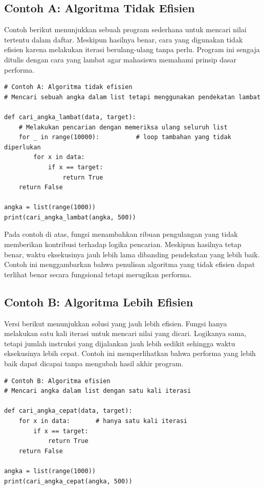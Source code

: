 \subsection{Contoh A: Algoritma Tidak Efisien}

Contoh berikut menunjukkan sebuah program sederhana untuk mencari nilai tertentu dalam daftar. Meskipun hasilnya benar, cara yang digunakan tidak efisien karena melakukan iterasi berulang-ulang tanpa perlu. Program ini sengaja ditulis dengan cara yang lambat agar mahasiswa memahami prinsip dasar performa.

\begin{lstlisting}[style=PythonStyle, caption={Contoh A: Algoritma tidak efisien}, label={lst:b14-a-algoritma-tidak-efisien}]
# Contoh A: Algoritma tidak efisien
# Mencari sebuah angka dalam list tetapi menggunakan pendekatan lambat

def cari_angka_lambat(data, target):
    # Melakukan pencarian dengan memeriksa ulang seluruh list
    for _ in range(10000):          # loop tambahan yang tidak diperlukan
        for x in data:
            if x == target:
                return True
    return False

angka = list(range(1000))
print(cari_angka_lambat(angka, 500))
\end{lstlisting}

Pada contoh di atas, fungsi menambahkan ribuan pengulangan yang tidak memberikan kontribusi terhadap logika pencarian. Meskipun hasilnya tetap benar, waktu eksekusinya jauh lebih lama dibanding pendekatan yang lebih baik. Contoh ini menggambarkan bahwa penulisan algoritma yang tidak efisien dapat terlihat benar secara fungsional tetapi merugikan performa.

\subsection{Contoh B: Algoritma Lebih Efisien}

Versi berikut menunjukkan solusi yang jauh lebih efisien. Fungsi hanya melakukan satu kali iterasi untuk mencari nilai yang dicari. Logikanya sama, tetapi jumlah instruksi yang dijalankan jauh lebih sedikit sehingga waktu eksekusinya lebih cepat. Contoh ini memperlihatkan bahwa performa yang lebih baik dapat dicapai tanpa mengubah hasil akhir program.

\begin{lstlisting}[style=PythonStyle, caption={Contoh B: Algoritma efisien}, label={lst:b14-b-algoritma-efisien}]
# Contoh B: Algoritma efisien
# Mencari angka dalam list dengan satu kali iterasi

def cari_angka_cepat(data, target):
    for x in data:       # hanya satu kali iterasi
        if x == target:
            return True
    return False

angka = list(range(1000))
print(cari_angka_cepat(angka, 500))
\end{lstlisting}

